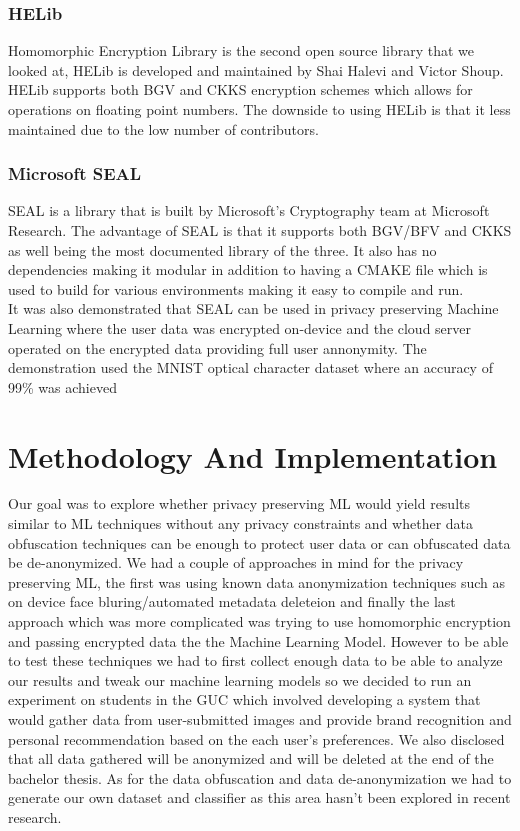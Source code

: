 \documentclass[10pt]{article}
\begin{document}
\subsubsection{HELib}
Homomorphic Encryption Library is the second open source library that we looked at, HELib is developed and maintained by Shai Halevi and Victor Shoup.
HELib supports both BGV and CKKS encryption schemes which allows for operations on floating point numbers.
The downside to using HELib is that it less maintained due to the low number of contributors.
\subsubsection{Microsoft SEAL}
SEAL is a library that is built by Microsoft’s Cryptography team at Microsoft Research\cite{SEAL}.
The advantage of SEAL is that it supports both BGV/BFV and CKKS as well being the most documented library of the three.
It also has no dependencies making it modular in addition to having a CMAKE file which is used to build for various environments making it easy to compile and run.\\

It was also demonstrated that SEAL can be used in privacy preserving Machine Learning where the user data was encrypted on-device and the cloud server operated on the encrypted data providing
full user annonymity. The demonstration used the MNIST optical character dataset where an accuracy of 99\% was achieved\cite{gilad2016cryptonets}
\section{Methodology And Implementation}

Our goal was to explore whether privacy preserving ML would yield results similar to ML techniques without any privacy constraints and whether data obfuscation techniques can be enough to protect user data or can obfuscated data be de-anonymized.
We had a couple of approaches in mind for the privacy preserving ML, the first was using known data anonymization techniques such as on device face bluring/automated metadata deleteion and 
finally the last approach which was more complicated was trying to use homomorphic encryption and passing encrypted data the the Machine Learning Model.
However to be able to test these techniques we had to first collect enough data to be able to analyze our results and tweak our machine learning models so we decided to run an experiment on students in the GUC which involved developing a system that would gather data from user-submitted images and provide brand recognition and personal recommendation based on the each user’s preferences.
We also disclosed that all data gathered will be anonymized and will be deleted at the end of the bachelor thesis.
As for the  data obfuscation and data de-anonymization we had to generate our own dataset and classifier as this area hasn't been explored in recent research.
\end{document}
